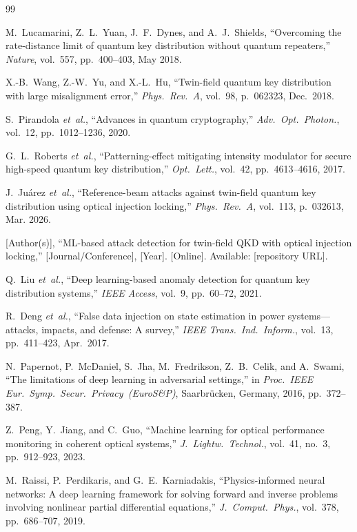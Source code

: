 \documentclass[journal,twocolumn]{IEEEtran}
\begin{document}
\begin{thebibliography}{99}

M.~Lucamarini, Z.~L.~Yuan, J.~F.~Dynes, and A.~J.~Shields,
``Overcoming the rate-distance limit of quantum key distribution without
quantum repeaters,''
\emph{Nature}, vol.~557, pp.~400--403, May 2018.

X.-B.~Wang, Z.-W.~Yu, and X.-L.~Hu,
``Twin-field quantum key distribution with large misalignment error,''
\emph{Phys.\ Rev.\ A}, vol.~98, p.~062323, Dec.\ 2018.

S.~Pirandola \emph{et~al.},
``Advances in quantum cryptography,''
\emph{Adv.\ Opt.\ Photon.}, vol.~12, pp.~1012--1236, 2020.

G.~L.~Roberts \emph{et~al.},
``Patterning-effect mitigating intensity modulator for secure high-speed
quantum key distribution,''
\emph{Opt.\ Lett.}, vol.~42, pp.~4613--4616, 2017.

J.~Juárez \emph{et~al.},
``Reference-beam attacks against twin-field quantum key distribution using
optical injection locking,''
\emph{Phys.\ Rev.\ A}, vol.~113, p.~032613, Mar. 2026.

[Author(s)],
``ML-based attack detection for twin-field QKD with optical injection locking,''
[Journal/Conference], [Year]. [Online]. Available: [repository URL].

Q.~Liu \emph{et~al.},
``Deep learning-based anomaly detection for quantum key distribution systems,''
\emph{IEEE Access}, vol.~9, pp.~60--72, 2021.

R.~Deng \emph{et~al.},
``False data injection on state estimation in power systems---attacks, impacts,
and defense: A survey,''
\emph{IEEE Trans.\ Ind.\ Inform.}, vol.~13, pp.~411--423, Apr.\ 2017.

N.~Papernot, P.~McDaniel, S.~Jha, M.~Fredrikson, Z.~B.~Celik, and A.~Swami,
``The limitations of deep learning in adversarial settings,''
in \emph{Proc.\ IEEE Eur.\ Symp.\ Secur.\ Privacy~(EuroS\&P)},
Saarbrücken, Germany, 2016, pp.~372--387.

Z.~Peng, Y.~Jiang, and C.~Guo,
``Machine learning for optical performance monitoring in coherent optical systems,''
\emph{J.\ Lightw.\ Technol.}, vol.~41, no.~3, pp.~912--923, 2023.

M.~Raissi, P.~Perdikaris, and G.~E.~Karniadakis,
``Physics-informed neural networks: A deep learning framework for solving
forward and inverse problems involving nonlinear partial differential equations,''
\emph{J.\ Comput.\ Phys.}, vol.~378, pp.~686--707, 2019.


\end{thebibliography}
\end{document}
